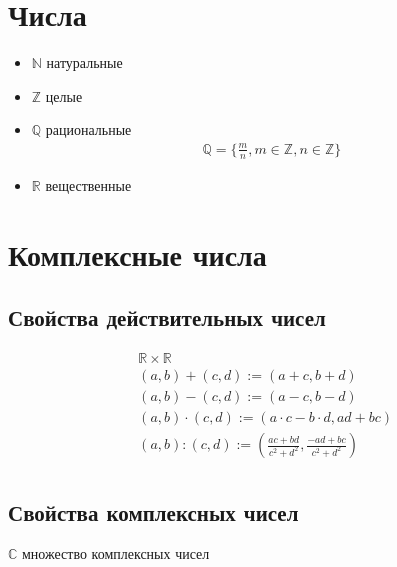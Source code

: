 \documentclass[14pt, a4paper]{report}
\begin{document}
\chapter{Числа}%
\label{cha:numbers}

\begin{itemize}
    \item $\mathbb{N}$ натуральные
    \item $\mathbb{Z}$ целые
    \item $\mathbb{Q}$ рациональные
        \begin{align*}
            \mathbb{Q} = \{ \frac{m}{n}, m \in \mathbb{Z}, n \in \mathbb{Z} \}
        \end{align*}
    \item $\mathbb{R}$ вещественные
\end{itemize}


\chapter{Комплексные числа}

\section{Свойства действительных чисел}

\begin{align*}
    & \mathbb{R} \times \mathbb{R}  \\
    & (a, b) + (c, d) := (a + c, b + d) \\
    & (a, b) - (c, d) := (a - c, b - d) \\
    & (a, b) \cdot (c, d) := (a \cdot c - b \cdot d, ad + bc) \\
    & (a, b) : (c, d) := (\frac{ac + bd}{c^2 + d^2}, \frac{-ad+bc}{c^2+d^2}) \\
\end{align*}


\section{Свойства комплексных чисел}

\begin{center}
    $\mathbb{C}$ множество комплексных чисел
\end{center}
\end{document}
